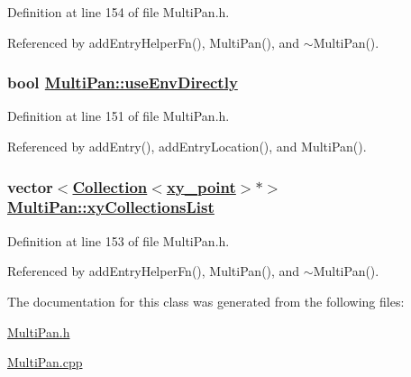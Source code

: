 Definition at line 154 of file Multi\-Pan.h.

Referenced by add\-Entry\-Helper\-Fn(), Multi\-Pan(), and $\sim$Multi\-Pan().\hypertarget{classMultiPan_r0}{
\subsubsection[useEnvDirectly]{\setlength{\rightskip}{0pt plus 5cm}bool \hyperlink{classMultiPan_r0}{Multi\-Pan::use\-Env\-Directly}}}
\label{classMultiPan_r0}




Definition at line 151 of file Multi\-Pan.h.

Referenced by add\-Entry(), add\-Entry\-Location(), and Multi\-Pan().\hypertarget{classMultiPan_r2}{
\subsubsection[xyCollectionsList]{\setlength{\rightskip}{0pt plus 5cm}vector$<$\hyperlink{classCollection}{Collection}$<$\hyperlink{structxy__point}{xy\_\-point}$>$$\ast$$>$ \hyperlink{classMultiPan_r2}{Multi\-Pan::xy\-Collections\-List}}}
\label{classMultiPan_r2}




Definition at line 153 of file Multi\-Pan.h.

Referenced by add\-Entry\-Helper\-Fn(), Multi\-Pan(), and $\sim$Multi\-Pan().

The documentation for this class was generated from the following files:\begin{CompactItemize}
\item 
\hyperlink{MultiPan_8h}{Multi\-Pan.h}\item 
\hyperlink{MultiPan_8cpp}{Multi\-Pan.cpp}\end{CompactItemize}
